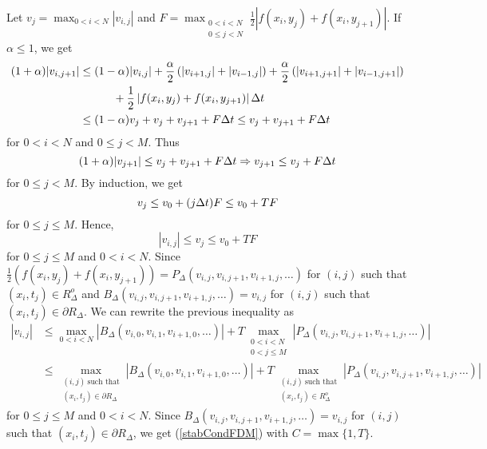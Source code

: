 {Let $\displaystyle v_j = \max_{0<i<N} |v_{i,j}|$ and
$\displaystyle F = \max_{\substack{0<i<N\\0\leq j<N}} \frac{1}{2}
  |f(x_i,y_j) + f(x_i,y_{j+1})|$.
If $\alpha \leq 1$, we get
\begin{align*}
(1 + \alpha) |v_{i,j+1}| &\leq (1-\alpha) |v_{i,j}|
+ \frac{\alpha}{2} \left( |v_{i+1,j}| + |v_{i-1,j}| \right)
+ \frac{\alpha}{2} \left( |v_{i+1,j+1}| + |v_{i-1,j+1}| \right) \\
& \qquad\quad + \frac{1}{2}\left| f(x_i,y_j) + f(x_i,y_{j+1})\right| \Delta{t} \\
& \leq (1-\alpha) v_j + v_j + v_{j+1} + F \Delta{t}
\leq v_j + v_{j+1} + F \Delta{t}
\end{align*}
for $0<i<N$ and $0\leq j < M$.  Thus
\[
(1 + \alpha) |v_{j+1}| \leq v_j + v_{j+1}  + F \Delta{t}
\Rightarrow
v_{j+1} \leq v_j + F \Delta{t}
\]
for $0\leq j < M$.  By induction, we get
\[
  v_j \leq v_0 + (j \Delta{t}) F \leq v_0 + T F 
\]
for $0\leq j \leq M$.  Hence,
\[
  |v_{i,j}| \leq v_j \leq v_0 + T F
\]
for $0\leq j \leq M$ and $0<i<N$.  Since
$\displaystyle \frac{1}{2}\left( f(x_i,y_j) + f(x_i,y_{j+1})\right)
= P_\Delta(v_{i,j},v_{i,j+1},v_{i+1,j},\ldots)$
for $(i,j)$ such that $(x_i,t_j) \in R_\Delta^o$
and $B_\Delta(v_{i,j},v_{i,j+1},v_{i+1,j},\ldots) = v_{i,j}$
for $(i,j)$ such that $(x_i,t_j) \in \partial R_\Delta$.  We can
rewrite the previous inequality as
\begin{align*}
|v_{i,j}| &\leq \max_{0<i<N}|B_\Delta(v_{i,0},v_{i,1},v_{i+1,0},\ldots)|
+ T \max_{\substack{0<i<N\\0<j\leq M}}|P_\Delta(v_{i,j},v_{i,j+1},v_{i+1,j},\ldots)|
\\
&\leq \max_{\substack{(i,j)\ \text{such that}\\(x_i,t_j) \in \partial R_\Delta}}
|B_\Delta(v_{i,0},v_{i,1},v_{i+1,0},\ldots)|
+ T \max_{\substack{(i,j)\ \text{such that}\\(x_i,t_j) \in R_\Delta^o}}
|P_\Delta(v_{i,j},v_{i,j+1},v_{i+1,j},\ldots)|
\end{align*}
for $0\leq j \leq M$ and $0<i<N$.  Since
$B_\Delta(v_{i,j},v_{i,j+1},v_{i+1,j},\ldots) = v_{i,j}$ for $(i,j)$
such that $(x_i,t_j) \in \partial R_\Delta$, we get 
(\ref{stabCondFDM}) with $C = \max \{1, T\}$.
}

